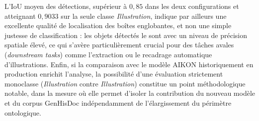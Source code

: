 L'IoU moyen des détections, supérieur à $0{,}85$ dans les deux configurations et atteignant $0{,}9033$ sur la seule classe \textit{Illustration}, indique par ailleurs une excellente qualité de localisation des boîtes englobantes, et non une simple justesse de classification : les objets détectés le sont avec un niveau de précision spatiale élevé, ce qui s'avère particulièrement crucial pour des tâches avales (\textit{downstream tasks}) comme l'extraction ou le recadrage automatique d'illustrations. Enfin, si la comparaison avec le modèle AIKON historiquement en production enrichit l'analyse, la possibilité d'une évaluation strictement monoclasse (\textit{Illustration} contre \textit{Illustration}) constitue un point méthodologique notable, dans la mesure où elle permet d'isoler la contribution du nouveau modèle et du corpus GenHisDoc indépendamment de l'élargissement du périmètre ontologique.

